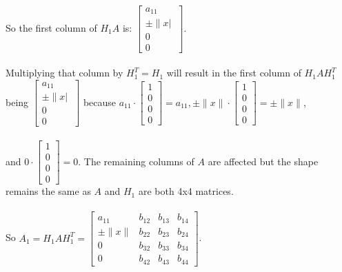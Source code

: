 \documentclass[12pt]{article}
\begin{document}
\begin{enumerate}[label=(\alph*)]
        So the first column of $H_1A$ is: $\begin{bmatrix} a_{11} \\ \pm \|x|\ \\ 0 \\ 0 \end{bmatrix}$. \\ \\
        Multiplying that column by $H_1^T=H_1$ will result in the first column of $H_1AH_1^T$ being
        $\begin{bmatrix} a_{11} \\ \pm \|x|\ \\ 0 \\ 0 \end{bmatrix}$ because $a_{11} \cdot \begin{bmatrix} 1 \\ 0 \\ 0 \\ 0 \end{bmatrix} = a_{11}, 
        \pm \|x\| \cdot \begin{bmatrix} 1 \\ 0 \\ 0 \\ 0 \end{bmatrix} = \pm \|x\|$, \\ \\
        and $0 \cdot \begin{bmatrix} 1 \\ 0 \\ 0 \\ 0 \end{bmatrix} = 0$. The remaining columns of $A$ are affected but the shape remains the same
        as $A$ and $H_1$ are both 4x4 matrices. \\ \\ So $A_1=H_1AH_1^T = \begin{bmatrix} 
            a_{11} & b_{12} & b_{13} & b_{14} \\
            \pm \|x\| & b_{22} & b_{23} & b_{24} \\
            0 & b_{32} & b_{33} & b_{34} \\
            0 & b_{42} & b_{43} & b_{44}
            \end{bmatrix}$.\\ \\
    

\end{enumerate}
\end{document}
